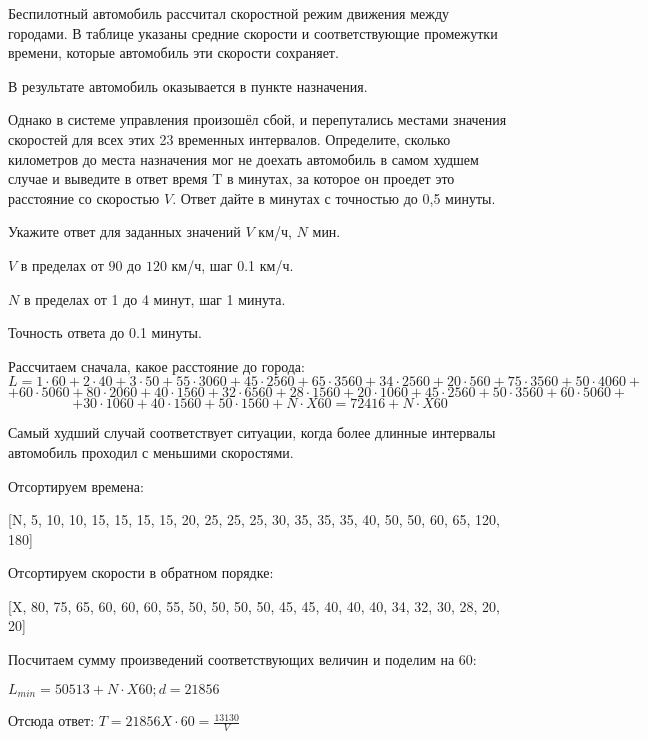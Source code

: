 
Беспилотный
автомобиль рассчитал скоростной режим движения между городами. В таблице указаны средние скорости и соответствующие промежутки времени, которые автомобиль эти скорости сохраняет.


В результате автомобиль оказывается в пункте назначения.

Однако в системе
управления произошёл сбой, и перепутались местами значения
скоростей для всех этих 23 временных интервалов. 
Определите, сколько километров до места назначения мог не доехать
автомобиль в самом худшем случае и выведите в ответ время T в минутах, за которое он проедет это расстояние со скоростью $V$. Ответ дайте в минутах с точностью до 0,5 минуты.

Укажите ответ для заданных значений $V$ км/ч, $N$ мин.

\paramSection

$V$ в пределах от $90$ до $120$ км/ч, шаг  0.1 км/ч.  

$N$ в пределах от 1 до 4 минут, шаг  1 минута.

Точность ответа  до  0.1 минуты.

\solutionSection

Рассчитаем сначала, какое расстояние до города:
$$L=1 \cdot 60 +2 \cdot 40+ 3 \cdot 50+ 55 \cdot 3060+45 \cdot 2560+ 65 \cdot 3560+ 34 \cdot 2560+ 20 \cdot 560+ 75 \cdot 3560+ 50 \cdot 4060+$$
$$+ 60 \cdot 5060+80 \cdot 2060+40 \cdot 1560+ 32 \cdot 6560+ 28 \cdot 1560+20 \cdot 1060+ 45 \cdot 2560+ 50 \cdot 3560+ 60 \cdot 5060+$$
$$+30 \cdot 1060+40 \cdot 1560+50 \cdot 1560+N \cdot X60=72416+N \cdot X60$$  

Самый худший случай соответствует ситуации, когда более длинные интервалы автомобиль проходил с меньшими скоростями.

Отсортируем времена:

[N, 5, 10, 10, 15, 15, 15, 15, 20, 25, 25, 25, 30, 35, 35, 35, 40, 50, 50, 60, 65, 120, 180]

Отсортируем скорости в обратном порядке:

[X, 80, 75, 65, 60, 60, 60, 55, 50, 50, 50, 50, 45, 45, 40, 40, 40, 34, 32, 30, 28, 20, 20] 

Посчитаем сумму произведений соответствующих величин и поделим на 60:

$L_{min}=50513+N \cdot X60  ;  d=21856$

Отсюда ответ: $ T=21856 X \cdot 60= \frac{13130}{V}$

